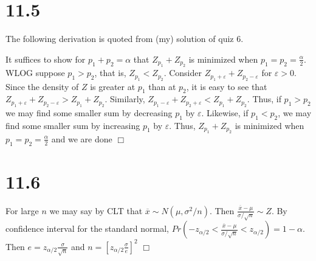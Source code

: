 \documentclass{article}
\newenvironment{myindentpar}[1]
  {\begin{list}{}
          {\setlength{\leftmargin}{#1}
          \setlength{\rightmargin}{#1}}

          \item[]
  }
  {\end{list}}
\begin{document}
\section*{11.5}
The following derivation is quoted from (my) solution of quiz 6.
\begin{myindentpar}{1em}
It suffices to show for $p_1+p_2 = \alpha$ that $Z_{p_1}+Z_{p_2}$ is minimized when $p_1=p_2=\frac{\alpha}{2}$. WLOG suppose $p_1 > p_2$, that is, $Z_{p_1} < Z_{p_2}$. Consider $Z_{p_1+\varepsilon} + Z_{p_2-\varepsilon}$ for $\varepsilon > 0$. Since the density of $Z$ is greater at $p_1$ than at $p_2$, it is easy to see that $Z_{p_1+\varepsilon} + Z_{p_2-\varepsilon} > Z_{p_1}+Z_{p_2}$. Similarly, $Z_{p_1-\varepsilon} + Z_{p_2+\varepsilon} < Z_{p_1}+Z_{p_2}$. Thus, if $p_1 > p_2$ we may find some smaller sum by decreasing $p_1$ by $\varepsilon$. Likewise, if $p_1 < p_2$, we may find some smaller sum by increasing $p_1$ by $\varepsilon$. Thus, $Z_{p_1}+Z_{p_2}$ is minimized when $p_1 = p_2 = \frac{\alpha}{2}$ and we are done $\Box$
\end{myindentpar}

\section*{11.6}
For large $n$ we may say by CLT that $\overline{x} \sim N(\mu,\sigma^2/n)$. Then $\frac{\overline{x}-\mu}{\sigma/\sqrt{n}} \sim Z$. By confidence interval for the standard normal, $Pr(-z_{\alpha/2} < \frac{\overline{x}-\mu}{\sigma/\sqrt{n}} < z_{\alpha/2}) = 1-\alpha$. Then $e = z_{\alpha/2}\frac{\sigma}{\sqrt{n}}$ and $n = \left[z_{\alpha/2}\frac{\sigma}{e}\right]^2$ $\Box$
\end{document}
